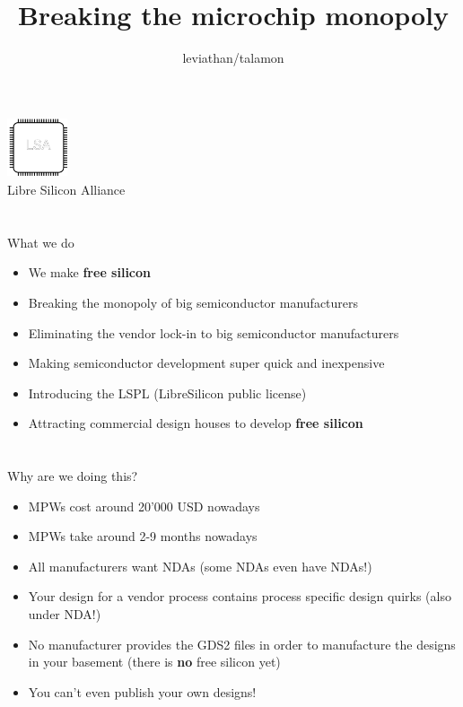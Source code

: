 \documentclass[9pt]{beamer}
\author{leviathan/talamon}
\title{Breaking the microchip monopoly}
\begin{document}
\begin{frame}
	\titlepage
	\begin{center}
		\includegraphics[width=50pt,height=50pt]{lsa.png}
		\\ Libre Silicon Alliance
	\end{center}
\end{frame}


\section[What]{}
\begin{frame}{What we do}
	\begin{itemize}
        \setlength\itemsep{1em}
		\item We make \textbf{free silicon}
		\item Breaking the monopoly of big semiconductor manufacturers
		\item Eliminating the vendor lock-in to big semiconductor manufacturers
		\item Making semiconductor development super quick and inexpensive
		\item Introducing the LSPL (LibreSilicon public license)
		\item Attracting commercial design houses to develop \textbf{free silicon}
	\end{itemize}
\end{frame}

\section[Why]{}
\begin{frame}{Why are we doing this?}
	\begin{itemize}
		\item MPWs cost around 20'000 USD nowadays
		\item MPWs take around 2-9 months nowadays
		\item All manufacturers want NDAs (some NDAs even have NDAs!)
		\item Your design for a vendor process contains process specific design quirks (also under NDA!)
		\item No manufacturer provides the GDS2 files in order to manufacture the designs in your basement (there is \textbf{no} free silicon yet)
		\item You can't even publish your own designs!
	\end{itemize}
\end{frame}
\end{document}
